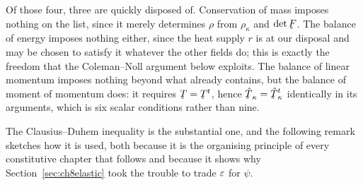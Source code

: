 Of those four, three are quickly disposed of. Conservation of mass
imposes nothing on the list, since it merely determines $\rho$ from
$\rho_{\kappa}$ and $\det\bF$. The balance of energy imposes nothing
either, since the heat supply $r$ is at our disposal and may be chosen
to satisfy it whatever the other fields do; this is exactly the freedom
that the Coleman--Noll argument below exploits. The balance of linear
momentum imposes nothing beyond what  already contains, but
the balance of moment of momentum does: it requires $\bT=\bT^{t}$, hence
$\hat\bT_{\kappa}=\hat\bT_{\kappa}^{t}$ identically in its arguments,
which is six scalar conditions rather than nine.

The Clausius--Duhem inequality is the substantial one, and the following
remark sketches how it is used, both because it is the organising
principle of every constitutive chapter that follows and because it
shows why Section~\ref{sec:ch8elastic} took the trouble to trade $\varepsilon$
for $\psi$.

